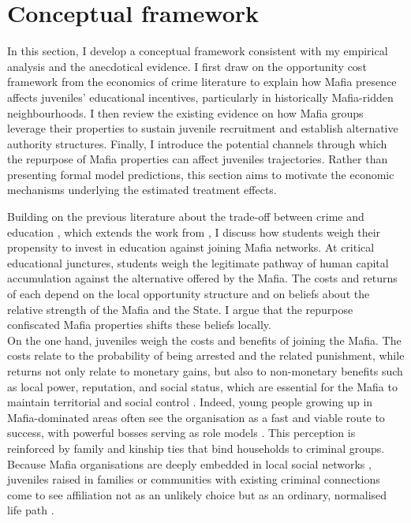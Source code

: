 \documentclass[12pt]{article}
\theoremstyle{plain}
\theoremstyle{plain}
\theoremstyle{plain}
\theoremstyle{definition}
\theoremstyle{plain}
\theoremstyle{definition}
\theoremstyle{plain}
\theoremstyle{remark}
\theoremstyle{definition}
\theoremstyle{definition}
\theoremstyle{plain}
\begin{document}
\section{Conceptual framework}
\label{sec:jmp_conc_framework}
In this section, I develop a conceptual framework consistent with my empirical analysis and the anecdotical evidence. I first draw on the opportunity cost framework from the economics of crime literature to explain how Mafia presence affects juveniles' educational incentives, particularly in historically Mafia-ridden neighbourhoods. I then review the existing evidence on how Mafia groups leverage their properties to sustain juvenile recruitment and establish alternative authority structures. Finally, I introduce the potential channels through which the repurpose of Mafia properties can affect juveniles trajectories. Rather than presenting formal model predictions, this section aims to motivate the economic mechanisms underlying the estimated treatment effects. \par
\medskip
Building on the previous literature  about the trade-off between crime and education \citep{lochner_education_2004, lochner_non-production_2011, lochner_effect_2004, machin_crime_2004}, which extends the work from \citet{becker_crime_1968}, I discuss how students weigh their propensity to invest in education against joining Mafia networks. At critical educational junctures, students weigh the legitimate pathway of human capital accumulation against the alternative offered by the Mafia. The costs and returns of each depend on the local opportunity structure and on beliefs about the relative strength of the Mafia and the State. I argue that the repurpose confiscated Mafia properties shifts these beliefs locally. \\

On the one hand, juveniles weigh the costs and benefits of joining the Mafia. The costs relate to the probability of being arrested and the related punishment, while returns not only relate to monetary gains, but also to non-monetary benefits such as local power, reputation, and social status, which are essential for the Mafia to maintain territorial and social control \citep{gambetta_sicilian_1993, sciarrone_il_1998}. Indeed, young people growing up in Mafia-dominated areas often see the organisation as a fast and viable route to success, with powerful bosses serving as role models \citep{caglayan_organized_2017}. This perception is reinforced by family and kinship ties that bind households to criminal groups. Because Mafia organisations are deeply embedded in local social networks \citep{sciarrone_il_1998}, juveniles raised in families or communities with existing criminal connections come to see affiliation not as an unlikely choice but as an ordinary, normalised life path \citep{sviatschi_making_2022}. 
\end{document}
